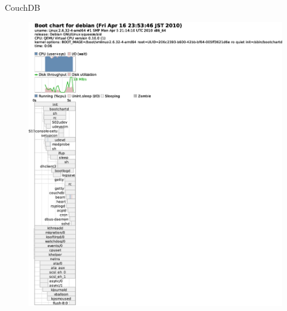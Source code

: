 \begin{frame}{CouchDB}
\begin{minipage}[t]{0.48\hsize}
\begin{figure}[h]
\begin{center}
\includegraphics[width=1.0\hsize]{image201004/upstart/upstart-couchdb-bootchart.eps}
\end{center}
\end{figure}
\end{minipage}
\end{frame}
